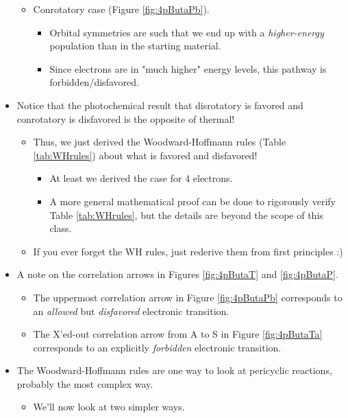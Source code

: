 \documentclass[../notes.tex]{subfiles}
\begin{document}
\begin{itemize}
\begin{itemize}
\begin{itemize}
        \end{itemize}
        \item Conrotatory case (Figure \ref{fig:4pButaPb}).
        \begin{itemize}
            \item Orbital symmetries are such that we end up with a \emph{higher-energy} population than in the starting material.
            \item Since electrons are in "much higher" energy levels, this pathway is forbidden/disfavored.
        \end{itemize}
    \end{itemize}
    \item Notice that the photochemical result that disrotatory is favored and conrotatory is disfavored is the opposite of thermal!
    \begin{itemize}
        \item Thus, we just derived the Woodward-Hoffmann rules (Table \ref{tab:WHrules}) about what is favored and disfavored!
        \begin{itemize}
            \item At least we derived the case for 4 electrons.
            \item A more general mathematical proof can be done to rigorously verify Table \ref{tab:WHrules}, but the details are beyond the scope of this class.
        \end{itemize}
        \item If you ever forget the WH rules, just rederive them from first principles :)
    \end{itemize}
    \item A note on the correlation arrows in Figures \ref{fig:4pButaT} and \ref{fig:4pButaP}.
    \begin{itemize}
        \item The uppermost correlation arrow in Figure \ref{fig:4pButaPb} corresponds to an \emph{allowed} but \emph{disfavored} electronic transition.
        \item The X'ed-out correlation arrow from A to S in Figure \ref{fig:4pButaTa} corresponds to an explicitly \emph{forbidden} electronic transition.
    \end{itemize}
    \item The Woodward-Hoffmann rules are one way to look at pericyclic reactions, probably the most complex way.
    \begin{itemize}
        \item We'll now look at two simpler ways.

\end{itemize}
\end{itemize}
\end{document}
